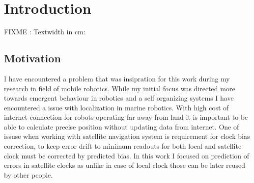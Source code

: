 \chapter{Introduction}
FIXME : Textwidth in cm: \prntlen{\textwidth}

\section{Motivation}
I have encountered a problem that was insipration for this work during my research in field
of mobile robotics. While my initial focus was directed more towards emergent behaviour in 
robotics and a self organizing systems I have encountered a issue with localization in marine 
robotics. With high cost of internet connection for robots operating far away from land it 
is important to be able to calculate precise position without updating data from internet.
One of issuse when working with satellite navigation system is requirement for clock bias
correction, to keep error drift to minimum readouts for both local and satellite clock must
be corrected by predicted bias. In this work I focused on prediction of errors in satellite
clocks as unlike in case of local clock those can be later reused by other people.


